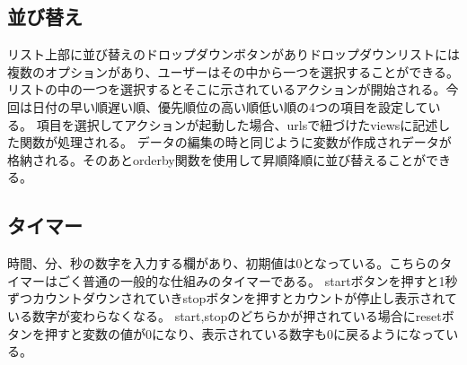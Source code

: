 \subsection{並び替え}
リスト上部に並び替えのドロップダウンボタンがありドロップダウンリストには複数のオプションがあり、ユーザーはその中から一つを選択することができる。
リストの中の一つを選択するとそこに示されているアクションが開始される。今回は日付の早い順遅い順、優先順位の高い順低い順の4つの項目を設定している。
項目を選択してアクションが起動した場合、urlsで紐づけたviewsに記述した関数が処理される。
データの編集の時と同じように変数が作成されデータが格納される。そのあとorderby関数を使用して昇順降順に並び替えることができる。

\subsection{タイマー}
時間、分、秒の数字を入力する欄があり、初期値は0となっている。こちらのタイマーはごく普通の一般的な仕組みのタイマーである。
startボタンを押すと1秒ずつカウントダウンされていきstopボタンを押すとカウントが停止し表示されている数字が変わらなくなる。
start,stopのどちらかが押されている場合にresetボタンを押すと変数の値が0になり、表示されている数字も0に戻るようになっている。



